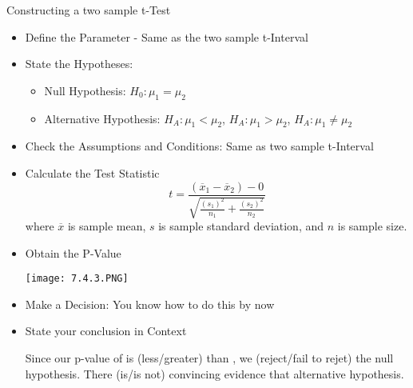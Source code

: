 \documentclass[../stats.tex]{subfiles}
\begin{document}
Constructing a two sample t-Test 
\begin{itemize}
    \item Define the Parameter - Same as the two sample t-Interval 
    \item State the Hypotheses:
    \begin{itemize}
        \item Null Hypothesis: $H_0: \mu_1=\mu_2$
        \item Alternative Hypothesis: $H_A: \mu_1<\mu_2$, $H_A: \mu_1>\mu_2$, $H_A: \mu_1\neq \mu_2$
    \end{itemize}
    \item Check the Assumptions and Conditions: Same as two sample t-Interval 
    \item Calculate the Test Statistic
    \[ t=\frac{(\overline{x}_1-\overline{x}_2)-0}{\sqrt{\frac{(s_1)^2}{n_1}+\frac{(s_2)^2}{n_2}}} \]
    where $\overline{x}$ is sample mean, $s$ is sample standard deviation, and $n$ is sample size.

    \item Obtain the P-Value 
    \begin{center}
        \texttt{[image: 7.4.3.PNG]}
    \end{center}

    \item Make a Decision: You know how to do this by now 
    \item State your conclusion in Context 
    
    Since our p-value of \blank is (less/greater) than \blank, we (reject/fail to rejet) the null hypothesis. There (is/is not) convincing evidence that {alternative hypothesis}.
\end{itemize}
\end{document}
